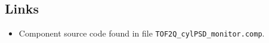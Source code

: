 \subsection*{Links}
\begin{itemize}
  \item Component source code found in file \texttt{TOF2Q\_cylPSD\_monitor.comp}.
\end{itemize}

